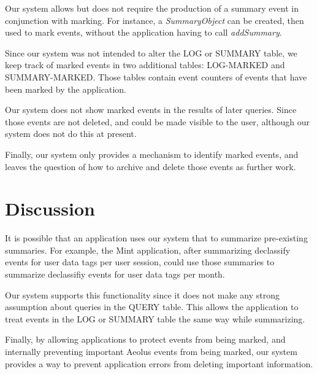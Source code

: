 Our system allows but does not require the production of a summary event in conjunction with marking. For instance, a \emph{SummaryObject} can be created, then used to mark events, without the application having to call \emph{addSummary}.

Since our system was not intended to alter the LOG or SUMMARY table, we keep track of marked events in two additional tables: LOG-MARKED and SUMMARY-MARKED. Those tables contain event counters of events that have been marked by the application.

Our system does not show marked events in the results of later queries. Since those events are not deleted, and could be made visible to the user, although our system does not do this at present.

Finally, our system only provides a mechanism to identify marked events, and leaves the question of how to archive and delete those events as further work.




\section{Discussion}

It is possible that an application uses our system that to summarize pre-existing summaries. For example, the Mint application, after summarizing declassify events for user data tags per user session, could use those summaries to summarize declassifiy events for user data tags per month.

Our system supports this functionality since it does not make any strong assumption about queries in the QUERY table. This allows the application to treat events in the LOG or SUMMARY table the same way while summarizing.

Finally, by allowing applications to protect events from being marked, and internally preventing important Aeolus events from being marked, our system provides a way to prevent application errors from deleting important information.
